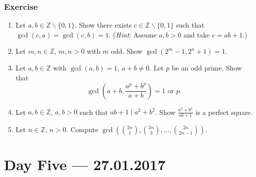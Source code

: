 \documentclass{amsbook}
\theoremstyle{plain}
\theoremstyle{definition}
\theoremstyle{remark}
\numberwithin{equation}{chapter}
\numberwithin{figure}{chapter}
\newcommand{\Z}{\mathbb{Z}}
\begin{document}
\subsection*{Exercise}
\begin{enumerate}
\item Let $a, b \in \Z\backslash\{0, 1\}$. Show there exists $c \in \Z\backslash \{0,1\}$  such that $\gcd (c, a) = \gcd (c, b) = 1$. (\emph{Hint}: Assume $a, b > 0$ and take $c = ab + 1$.)
\item Let $m, n \in \Z$, $m, n > 0$ with $m$ odd. Show $\gcd (2^m - 1, 2^n + 1) = 1$.
\item Let $a, b \in \Z$ with $\gcd (a, b) = 1$, $a + b \neq 0$. Let $p$ be an odd prime. Show that
  \[
    \gcd \left( a+b, \frac{a^p+b^p}{a+b} \right) = 1 \text{ or } p.
  \]
\item Let $a,b \in \Z$, $a, b>0$ such that $ab+1 \mid a^2+b^2$. Show $\frac{a^2+b^2}{ab+1}$ is a perfect square.
\item Let $n \in \Z$, $n > 0$. Compute $\gcd \left( \binom{2n}{1}, \binom{2n}{3}, \ldots, \binom{2n}{2n-1} \right)$.
\end{enumerate}
\chapter[Lecture Five]{Day Five \hfill {\footnotesize \rm --- 27.01.2017}}\label{chp:fta}
\end{document}
